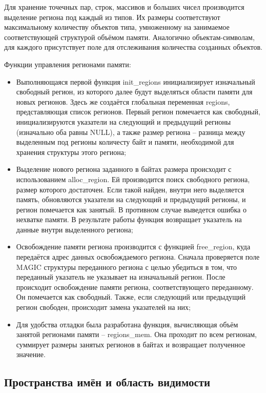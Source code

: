 Для хранение точечных пар, строк, массивов и больших чисел производится выделение региона под каждый из типов. Их размеры соответствуют максимальному количеству объектов типа, умноженному на занимаемое соответствующей структурой объёмом памяти. Аналогично объектам-символам, для каждого присутствует поле для отслеживания количества созданных объектов.

Функции управления регионами памяти:

\begin{itemize}
	\item Выполняющаяся первой функция init\_regions инициализирует изначальный свободный регион, из которого далее будут выделяться области памяти для новых регионов. Здесь же создаётся глобальная переменная regions, представляющая список регионов. Первый регион помечается как свободный, инициализируются указатели на следующий и предыдущий регионы (изначально оба равны NULL), а также размер региона -- разница между выделенным под регионы количесту байт и памяти, необходимой для хранения структуры этого региона;
	
	\item Выделение нового региона заданного в байтах размера происходит с использованием alloc\_region. Ей производится поиск свободного региона, размер которого достаточен. Если такой найден, внутри него выделяется память, обновляются указатели на следующий и предыдущий регионы, и регион помечается как занятый. В противном случае выведется ошибка о нехватке памяти. В результате работы функция возвращает указатель на данные внутри выделенного региона;
	
	\item Освобождение памяти региона производится с функцией free\_region, куда передаётся адрес данных освобождаемого региона. Сначала проверяется поле MAGIC структуры переданного региона с целью убедиться в том, что переданный указатель не указывает на изначальный регион. После происходит освобождение памяти региона, соответствующего переданному. Он помечается как свободный. Также, если следующий или предыдущий регион свободен, происходит замена указателей на них;
	
	\item Для удобства отладки была разработана функция, вычисляющая объём занятой регионами памяти -- regions\_mem. Она проходит по всем регионам, суммирует размеры занятых регионов в байтах и возвращает полученное значение.
\end{itemize}


\subsection{Пространства имён и область видимости}

